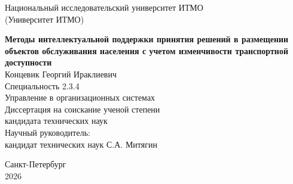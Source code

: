 \thispagestyle{empty}

\vspace{0pt plus2fill}
\begin{center}
    Национальный исследовательский университет ИТМО\\
    (Университет ИТМО)
\end{center}

\vspace*{185pt}
\begin{center}
\textbf{\large
Методы интеллектуальной поддержки принятия решений в размещении объектов
обслуживания населения с учетом изменчивости транспортной доступности
}\\[3\baselineskip]

{\large Концевик Георгий Ираклиевич}\\[1.5\baselineskip]

Специальность 2.3.4\\
Управление в организационных системах\\[2\baselineskip]

Диссертация на соискание ученой степени\\
кандидата технических наук\\[2\baselineskip]

Научный руководитель:\\
кандидат технических наук С.А. Митягин
\end{center}

\vspace{0pt plus2fill}

\begin{center}
    Санкт-Петербург\\
    2026
\end{center}

